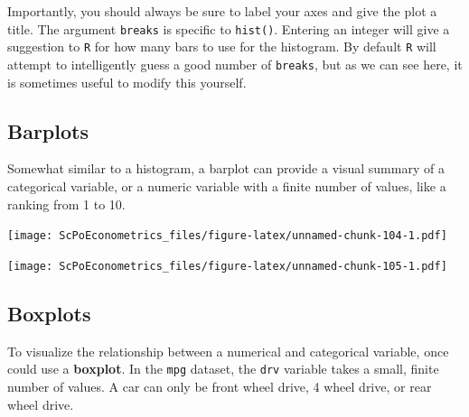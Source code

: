 \documentclass[]{book}
\newenvironment{Shaded}{\begin{snugshade}}{\end{snugshade}}
\newcommand{\KeywordTok}[1]{\textcolor[rgb]{0.13,0.29,0.53}{\textbf{#1}}}
\newcommand{\DataTypeTok}[1]{\textcolor[rgb]{0.13,0.29,0.53}{#1}}
\newcommand{\StringTok}[1]{\textcolor[rgb]{0.31,0.60,0.02}{#1}}
\newcommand{\OperatorTok}[1]{\textcolor[rgb]{0.81,0.36,0.00}{\textbf{#1}}}
\newcommand{\NormalTok}[1]{#1}
\theoremstyle{definition}
\theoremstyle{definition}
\theoremstyle{definition}
\theoremstyle{remark}
\begin{document}
Importantly, you should always be sure to label your axes and give the
plot a title. The argument \texttt{breaks} is specific to
\texttt{hist()}. Entering an integer will give a suggestion to
\texttt{R} for how many bars to use for the histogram. By default
\texttt{R} will attempt to intelligently guess a good number of
\texttt{breaks}, but as we can see here, it is sometimes useful to
modify this yourself.

\subsection{Barplots}\label{barplots}

Somewhat similar to a histogram, a barplot can provide a visual summary
of a categorical variable, or a numeric variable with a finite number of
values, like a ranking from 1 to 10.

\begin{Shaded}
\end{Shaded}

\texttt{[image: ScPoEconometrics\_files/figure-latex/unnamed-chunk-104-1.pdf]}

\begin{Shaded}
\end{Shaded}

\texttt{[image: ScPoEconometrics\_files/figure-latex/unnamed-chunk-105-1.pdf]}

\subsection{Boxplots}\label{boxplots}

To visualize the relationship between a numerical and categorical
variable, once could use a \textbf{boxplot}. In the \texttt{mpg}
dataset, the \texttt{drv} variable takes a small, finite number of
values. A car can only be front wheel drive, 4 wheel drive, or rear
wheel drive.
\end{document}
